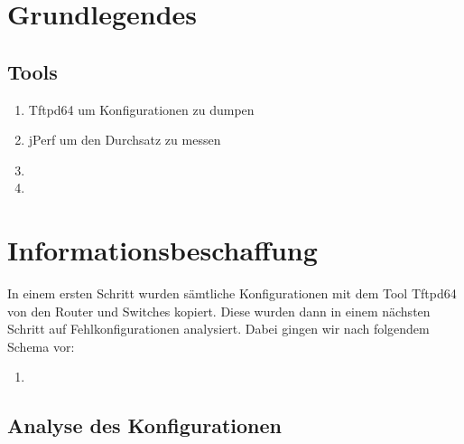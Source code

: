 

\newcommand{\SUBJECT}{Report}
\newcommand{\TITLE}{Cloud Infrastructre Lab 1}







\section{Grundlegendes}
\subsection{Tools}
\begin{enumerate}
	\item Tftpd64 um Konfigurationen zu dumpen
	\item jPerf um den Durchsatz zu messen
	\item %
	\item %
\end{enumerate}

\section{Informationsbeschaffung}
In einem ersten Schritt wurden sämtliche Konfigurationen mit dem Tool Tftpd64 von den Router und Switches kopiert. Diese wurden dann in einem nächsten Schritt auf Fehlkonfigurationen analysiert. Dabei gingen wir nach folgendem Schema vor:

\begin{enumerate}
	\item 
\end{enumerate}

\subsection{Analyse des Konfigurationen}
